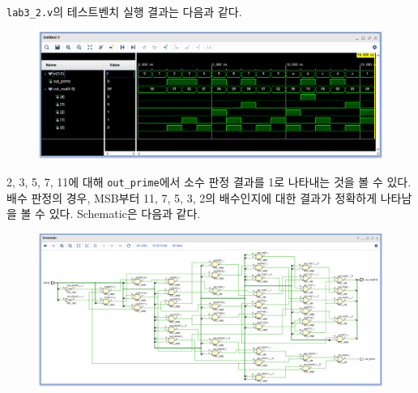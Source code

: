 \documentclass{scrartcl}
\begin{document}
\texttt{lab3\_2.v}의 테스트벤치 실행 결과는 다음과 같다.
\begin{figure}[H]
  \centering
  \includegraphics[width=\linewidth]{lab3_2_waveform}
\end{figure}
2, 3, 5, 7, 11에 대해 \texttt{out\_prime}에서 소수 판정 결과를 1로 나타내는 것을 볼 수 있다.
배수 판정의 경우, MSB부터 11, 7, 5, 3, 2의 배수인지에 대한 결과가 정확하게 나타남을 볼 수 있다.
Schematic은 다음과 같다.
\begin{figure}[H]
  \centering
  \includegraphics[width=\linewidth]{lab3_2_schematic}
\end{figure}
\end{document}
